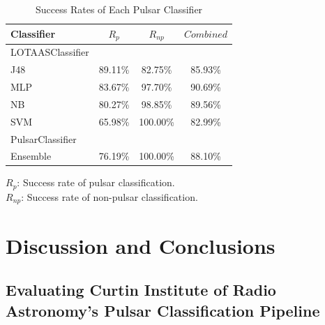 \documentclass{article}
\begin{document}
\begin{table}[H]
    \centering
    
    \caption{Success Rates of Each Pulsar Classifier}

    \begin{framed}
        \begin{tabular}{l c c c}
            Classifier & $R_p$ & $R_{np}$ & $Combined$ \\
            \hline
            \hline
            LOTAASClassifier &  &  & \\
            \hline
            J48 & 89.11\% & 82.75\% & 85.93\% \\
            MLP & 83.67\% & 97.70\% & 90.69\% \\
            NB & 80.27\% & 98.85\% & 89.56\%\\
            SVM & 65.98\% & 100.00\% & 82.99\% \\
            \hline
            PulsarClassifier &  &  & \\
            \hline
            Ensemble & 76.19\% & 100.00\% & 88.10\% \\
        \end{tabular}

        \vspace{5px}
        $R_p$: Success rate of pulsar classification.\\
        $R_{np}$: Success rate of non-pulsar classification. \\
    \end{framed}
    \label{tab:analyses}
\end{table}

\pagebreak
\section{Discussion and Conclusions}
\subsection{Evaluating Curtin Institute of Radio Astronomy's Pulsar Classification Pipeline}
\end{document}
